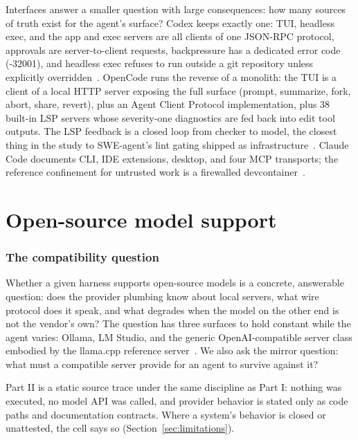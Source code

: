 \documentclass{article}
\newcommand{\codex}[0]{Codex}
\newcommand{\occ}[0]{OpenCode}
\newcommand{\ccc}[0]{Claude Code}
\begin{document}
Interfaces answer a smaller question with large consequences: how many
sources of truth exist for the agent's surface? \codex{} keeps exactly
one: TUI, headless exec, and the app and exec servers are all clients of
one JSON-RPC protocol, approvals are server-to-client requests,
backpressure has a dedicated error code (-32001), and headless exec
refuses to run outside a git repository unless explicitly
overridden~\citep{codexRepo}. \occ{} runs the reverse of a monolith: the
TUI is a client of a local HTTP server exposing the full surface (prompt,
summarize, fork, abort, share, revert), plus an Agent Client Protocol
implementation, plus 38 built-in LSP servers whose severity-one
diagnostics are fed back into edit tool outputs. The LSP feedback is a
closed loop from checker to model, the closest thing in the study to
SWE-agent's lint gating shipped as
infrastructure~\citep{opencodeRepo,yang2024sweagent}. \ccc{} documents
CLI, IDE extensions, desktop, and four MCP transports; the reference
confinement for untrusted work is a firewalled
devcontainer~\citep{claudeCodeDocsPermissions,claudeCodeDocsMcp,%
claudeCodePluginSurface}.

\part{Open-source model support}

\section{The compatibility question}
\label{sec:compatintro}

Whether a given harness supports open-source models is a concrete,
answerable question: does the provider plumbing know about local servers,
what wire protocol does it speak, and what degrades when the model on the
other end is not the vendor's own? The question has three surfaces to
hold constant while the agent varies: Ollama, LM Studio, and the generic
OpenAI-compatible server class embodied by the llama.cpp reference
server~\citep{ollamaCompatDocs,lmstudioApiDocs,llamaCppServerDocs}. We
also ask the mirror question: what must a compatible server provide for
an agent to survive against it?

Part II is a static source trace under the same discipline as Part I:
nothing was executed, no model API was called, and provider behavior is
stated only as code paths and documentation contracts. Where a system's
behavior is closed or unattested, the cell says so
(Section~\ref{sec:limitations}).
\end{document}
